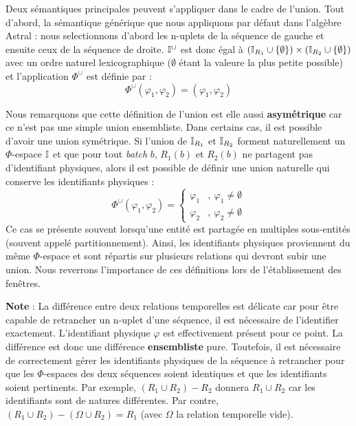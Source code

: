 Deux sémantiques principales peuvent s'appliquer dans le cadre de l'union. Tout d'abord, la sémantique générique que nous appliquons par défaut dans l'algèbre Astral : nous selectionnons d'abord les n-uplets de la séquence de gauche et ensuite ceux de la séquence de droite. $\mathbb{I}^\cup$ est donc égal à $(\mathbb{I}_{R_1}\cup \{\emptyset\})\times (\mathbb{I}_{R_2}\cup \{\emptyset\})$ avec un ordre naturel lexicographique ($\emptyset$ étant la valeure la plus petite possible) et l'application $\Phi^\cup$ est définie par : $$\Phi^\cup(\varphi_1,\varphi_2) = (\varphi_1,\varphi_2)$$

Nous remarquons que cette définition de l'union est elle aussi \textbf{asymétrique} car ce n'est pas une simple union ensembliste. Dans certains cas, il est possible d'avoir une union symétrique. Si l'union de $\mathbb{I}_{R_1}$ et $\mathbb{I}_{R_2}$ forment naturellement un $\Phi$-espace $\mathbb{I}$ et que pour tout \textit{batch} $b$, $R_1(b)$ et $R_2(b)$ ne partagent pas d'identifiant physiques, alors il est possible de définir une union naturelle qui conserve les identifiants physiques : $$\Phi^\cup(\varphi_1,\varphi_2) = \begin{cases} \varphi_1 & ,\ \varphi_1 \neq \emptyset \\\varphi_2 &,\ \varphi_2 \neq \emptyset\end{cases}$$
Ce cas se présente souvent lorsqu'une entité est partagée en multiples sous-entités (souvent appelé partitionnement). Ainsi, les identifiants physiques proviennent du même $\Phi$-espace et sont répartis sur plusieurs relations qui devront subir une union. Nous reverrons l'importance de ces définitions lors de l'établissement des fenêtres.

\textbf{Note} : La différence entre deux relations temporelles est délicate car pour être capable de retrancher un n-uplet d'une séquence, il est nécessaire de l'identifier exactement. L'identifiant physique $\varphi$ est effectivement présent pour ce point. La différence est donc une différence \textbf{ensembliste} pure. Toutefois, il est nécessaire de correctement gérer les identifiants physiques de la séquence à retrancher pour que les $\Phi$-espaces des deux séquences soient identiques et que les identifiants soient pertinents. Par exemple, $(R_1\cup R_2)-R_2$ donnera $R_1\cup R_2$ car les identifiants sont de natures différentes. Par contre, $(R_1\cup R_2)-(\Omega \cup R_2)=R_1$ (avec $\Omega$ la relation temporelle vide).

